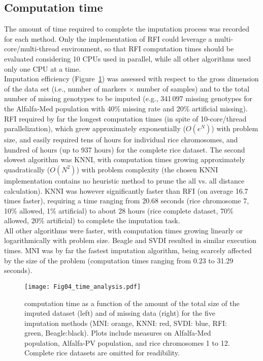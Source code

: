 \subsection{Computation time}
\label{sec:computation_time}  
The amount of time required to complete the imputation process was recorded for each method. Only the implementation of RFI could leverage a multi-core/multi-thread environment, so that RFI computation times should be evaluated considering 10 CPUs used in parallel, while all other algorithms used only one CPU at a time.\\
Imputation efficiency (Figure~\ref{fig:time_analysis}) was assessed with respect to the gross dimension of the data set (i.e., number of markers $\times$ number of samples) and to the total number of missing genotypes to be imputed (e.g., 341\,097 missing genotypes for the Alfalfa-Med population with 40\% missing rate and 20\% artificial missing).
RFI required by far the longest computation times (in spite of 10-core/thread parallelization), which grew approximately exponentially ($O(e^N)$) with problem size, and easily required tens of hours for individual rice chromosomes, and hundred of hours (up to 937 hours) for the complete rice dataset. The second slowest algorithm was KNNI, with computation times growing approximately quadratically ($O(N^2)$) with problem complexity (the chosen KNNI implementation contains no heuristic method to prune the all vs. all distance calculation). KNNI was however significantly faster than RFI (on average 16.7 times faster), requiring a time ranging from 20.68 seconds (rice chromosome 7, 10\% allowed, 1\% artificial) to about 28 hours (rice complete dataset, 70\% allowed, 20\% artificial) to complete the imputation task.\\
All other algorithms were faster, with computation times growing linearly or logarithmically with problem size. Beagle and SVDI resulted in similar execution times. MNI was by far the fastest imputation algorithm, being scarcely affected by the size of the problem (computation times ranging from 0.23 to 31.29 seconds).

\begin{figure}
\texttt{[image: Fig04\_time\_analysis.pdf]}
\caption[Computation times]{computation time as a function of the amount of the total size of the imputed dataset (left) and of missing data (right) for the five imputation methods (MNI: orange, KNNI: red, SVDI: blue, RFI: green, Beagle:black). Plots include measures on Alfalfa-Med population, Alfalfa-PV population, and rice chromosomes 1 to 12. Complete rice datasets are omitted for readibility.}
\label{fig:time_analysis}
\end{figure}
